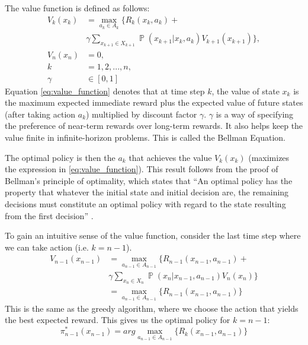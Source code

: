 \documentclass[conference]{IEEEtran}
\DeclareMathOperator*{\Prob}{\mathbb{P}}
\begin{document}
The value function is defined as follows:
\begin{equation}
\begin{aligned}
V_k(x_k) &= \max_{a_k \in A_k} \{ R_k(x_k,a_k) + \\
         & \gamma\sum_{x_{k+1} \in X_{k+1}} \Prob(x_{k+1}|x_k,a_k) V_{k+1}(x_{k+1}) \}, \\
V_n(x_n) &= 0,\\
k &= 1,2,...,n,\\
\gamma &\in [0, 1]
\label{eq:value_function}
\end{aligned}
\end{equation}
Equation \eqref{eq:value_function} denotes that at time step $k$, the value of state $x_k$ is the maximum expected immediate reward plus the expected value of future states (after taking action $a_k$) multiplied by discount factor $\gamma$. $\gamma$ is a way of specifying the preference of near-term rewards over long-term rewards. It also helps keep the value finite in infinite-horizon problems. This is called the Bellman Equation.

The optimal policy is then the $a_k$ that achieves the value $V_k(x_k)$ (maximizes the expression in \eqref{eq:value_function}). This result follows from the proof of Bellman's principle of optimality, which states that ``An optimal policy has the property that whatever the initial state and initial decision are, the remaining decisions must constitute an optimal policy with regard to the state resulting from the first decision'' \cite{bellman1966dynamic}.

To gain an intuitive sense of the value function, consider the last time step where we can take action (i.e. $k=n-1$).
\begin{equation}
\begin{aligned}
V_{n-1}(x_{n-1}) &= \max_{a_{n-1} \in A_{n-1}} \{ R_{n-1}(x_{n-1},a_{n-1}) + \\
         & \gamma\sum_{x_n \in X_n} \Prob(x_n|x_{n-1},a_{n-1}) V_n(x_n) \} \\
         &= \max_{a_{n-1} \in A_{n-1}} \{ R_{n-1}(x_{n-1},a_{n-1})\}
\label{eq:value_function_example}
\end{aligned}
\end{equation}
This is the same as the greedy algorithm, where we choose the action that yields the best expected reward. This gives us the optimal policy for $k=n-1$:
\begin{equation}
\pi^*_{n-1}(x_{n-1}) = arg\max_{a_{n-1} \in A_{n-1}} \{ R_k(x_{n-1},a_{n-1})\}
\label{eq:value_function_example_optimal_policy}
\end{equation}
\end{document}
